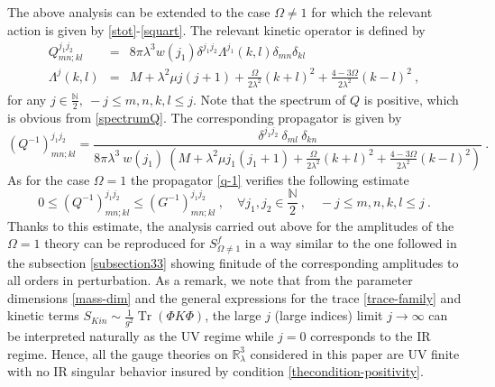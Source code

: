 \documentclass[a4paper,11pt,twoside]{article}
\numberwithin{equation}{section}
\DeclareMathOperator{\tr}{Tr}
\theoremstyle{nonumberplain}
\newcounter{and}
\begin{document}
The above analysis can be extended to the case $\Omega\ne1$ for which the relevant action is given by \eqref{stot}-\eqref{squart}. The relevant kinetic operator is defined by%
%
\begin{eqnarray}
Q^{j_1j_2}_{mn;kl} &=& 8\pi\lambda^3w(j_1) \delta^{j_1j_2} \Lambda^{j_1}(k,l)\delta_{mn}\delta_{kl}\label{propaQ} \\
\Lambda^{j}(k,l)&=& M+\lambda^2\mu j(j+1)+\frac{\Omega}{2\lambda^2}(k+l)^2+\frac{4-3\Omega}{2\lambda^2}(k-l)^2 \ , \label{spectrumQ}
\end{eqnarray}
%
for any $j\in\frac{\mathbb{N}}{2},\ -j\le m,n,k,l\le j$. Note that the spectrum of $Q$ is positive, which is obvious from \eqref{spectrumQ}. The corresponding propagator is given by%
%
\begin{equation}
(Q^{-1})^{j_1j_2}_{mn;kl} = 
\frac{ \delta^{j_1j_2} \ \delta_{ml} \ \delta_{kn}}{8\pi\lambda^3 \ w(j_1) \ \left(M +\lambda^2\mu j_1(j_1+1) + \frac{\Omega}{2\lambda^2} (k+l)^2 + \frac{4-3\Omega}{2\lambda^2} (k-l)^2 \right) } \ . \label{q-1}
\end{equation}
%
As for the case $\Omega=1$ the propagator \eqref{q-1} verifies the following estimate%
%
\begin{equation}
0\le (Q^{-1})^{j_1j_2}_{mn;kl}\le(G^{-1})^{j_1j_2}_{mn;kl} \ , \quad \forall j_1,j_2\in\frac{\mathbb{N}}{2} \ , \quad -j\le m,n,k,l\le j \ . \label{envelop-number2}
\end{equation}
%
Thanks to this estimate, the analysis carried out above for the amplitudes of the $\Omega=1$ theory can be reproduced for $S^f_{\Omega\ne1}$ in a way similar to the one followed in the subsection \ref{subsection33} showing finitude of the corresponding amplitudes to all orders in perturbation. As a remark, we note that from the parameter dimensions \eqref{mass-dim} and the general expressions for the trace \eqref{trace-family} and kinetic terms $S_{Kin}\sim\frac{1}{g^2}\tr(\Phi K\Phi)$, the large $j$ (large indices) limit $j\to\infty$ can be interpreted naturally as the UV regime while $j=0$ corresponds to the IR regime. Hence, all the gauge theories on $\mathbb{R}^3_\lambda$ considered in this paper are UV finite with no IR singular behavior insured by condition \eqref{thecondition-positivity}.\par
\end{document}
